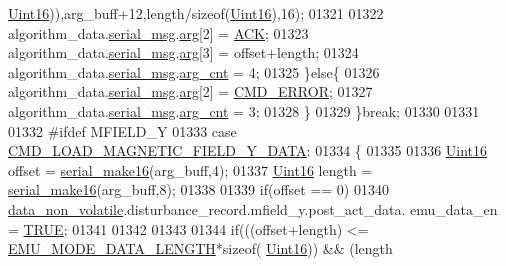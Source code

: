 \begin{DoxyCode}
{{{{{      \hyperlink{a00072_a59a9f6be4562c327cbfb4f7e8e18f08b}{Uint16})),arg\_buff+12,length/\textcolor{keyword}{sizeof}(\hyperlink{a00072_a59a9f6be4562c327cbfb4f7e8e18f08b}{Uint16}),16);
01321 
01322                          algorithm\_data.\hyperlink{a00016_afcf5f557aea688aad985eec15269c1da}{serial\_msg}.\hyperlink{a00031_af7d6f762438c80072bd9dc0e4dd4ae1e}{arg}[2] = \hyperlink{a00021_a6f6489887e08bff4887d0bc5dcf214d8}{ACK};
01323                          algorithm\_data.\hyperlink{a00016_afcf5f557aea688aad985eec15269c1da}{serial\_msg}.\hyperlink{a00031_af7d6f762438c80072bd9dc0e4dd4ae1e}{arg}[3] = offset+length;
01324                          algorithm\_data.\hyperlink{a00016_afcf5f557aea688aad985eec15269c1da}{serial\_msg}.\hyperlink{a00031_a7b79f40e2eeec288091afd340bf8f591}{arg\_cnt} = 4;
01325                      \}\textcolor{keywordflow}{else}\{
01326                          algorithm\_data.\hyperlink{a00016_afcf5f557aea688aad985eec15269c1da}{serial\_msg}.\hyperlink{a00031_af7d6f762438c80072bd9dc0e4dd4ae1e}{arg}[2] = 
      \hyperlink{a00021_a1764a522e9c1a59a59be8757c69fa494}{CMD\_ERROR};
01327                          algorithm\_data.\hyperlink{a00016_afcf5f557aea688aad985eec15269c1da}{serial\_msg}.\hyperlink{a00031_a7b79f40e2eeec288091afd340bf8f591}{arg\_cnt} = 3;
01328                      \}
01329                 \}\textcolor{keywordflow}{break};
01330 
01331 
01332 \textcolor{preprocessor}{#ifdef MFIELD\_Y}
01333                  \textcolor{keywordflow}{case}  \hyperlink{a00021_ace011e2ba41b184650e8bd0ddbfa00d2}{CMD\_LOAD\_MAGNETIC\_FIELD\_Y\_DATA}:
01334                 \{
01335 
01336                     \hyperlink{a00072_a59a9f6be4562c327cbfb4f7e8e18f08b}{Uint16} offset = \hyperlink{a00031_abc17de32f14103a5be219df0d4ad9176}{serial\_make16}(arg\_buff,4);
01337                     \hyperlink{a00072_a59a9f6be4562c327cbfb4f7e8e18f08b}{Uint16} length = \hyperlink{a00031_abc17de32f14103a5be219df0d4ad9176}{serial\_make16}(arg\_buff,8);
01338 
01339                     \textcolor{keywordflow}{if}(offset == 0)
01340                         \hyperlink{a00060_a76ac5f917f5308dcd83de0d7c94559fb}{data\_non\_volatile}.disturbance\_record.mfield\_y.post\_act\_data.
      emu\_data\_en = \hyperlink{a00040_aa8cecfc5c5c054d2875c03e77b7be15d}{TRUE};
01341 
01342 
01343   
01344                      \textcolor{keywordflow}{if}(((offset+length) <= \hyperlink{a00022_af4c3a8ad94feb4d7bda7f107f34baf41}{EMU\_MODE\_DATA\_LENGTH}*\textcolor{keyword}{sizeof}(
      \hyperlink{a00072_a59a9f6be4562c327cbfb4f7e8e18f08b}{Uint16})) && (length%
}}}}}
\end{DoxyCode}
